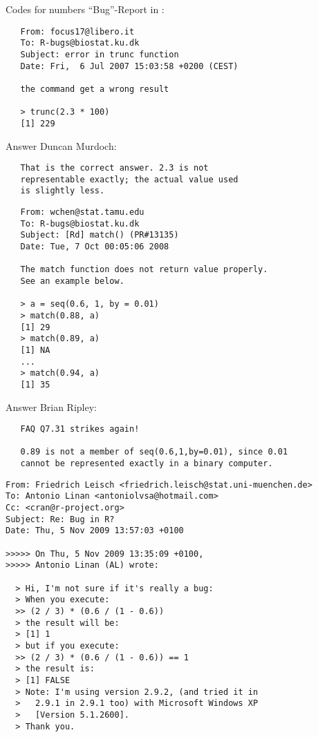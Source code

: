\begin{vbframe}{Codes for numbers}
\enquote{Bug}-Report in :
\small
\begin{verbatim}
   From: focus17@libero.it
   To: R-bugs@biostat.ku.dk
   Subject: error in trunc function
   Date: Fri,  6 Jul 2007 15:03:58 +0200 (CEST)

   the command get a wrong result

   > trunc(2.3 * 100)
   [1] 229
\end{verbatim}

Answer Duncan Murdoch:
\begin{verbatim}
   That is the correct answer. 2.3 is not
   representable exactly; the actual value used
   is slightly less.
\end{verbatim}

\framebreak

\small
\begin{verbatim}
   From: wchen@stat.tamu.edu
   To: R-bugs@biostat.ku.dk
   Subject: [Rd] match() (PR#13135)
   Date: Tue, 7 Oct 00:05:06 2008

   The match function does not return value properly.
   See an example below.

   > a = seq(0.6, 1, by = 0.01)
   > match(0.88, a)
   [1] 29
   > match(0.89, a)
   [1] NA
   ...
   > match(0.94, a)
   [1] 35
\end{verbatim}

\framebreak 

Answer Brian Ripley:
\begin{verbatim}
   FAQ Q7.31 strikes again!

   0.89 is not a member of seq(0.6,1,by=0.01), since 0.01
   cannot be represented exactly in a binary computer.
\end{verbatim}


\framebreak

\small
\begin{verbatim}
From: Friedrich Leisch <friedrich.leisch@stat.uni-muenchen.de>
To: Antonio Linan <antoniolvsa@hotmail.com>
Cc: <cran@r-project.org>
Subject: Re: Bug in R?
Date: Thu, 5 Nov 2009 13:57:03 +0100

>>>>> On Thu, 5 Nov 2009 13:35:09 +0100,
>>>>> Antonio Linan (AL) wrote:

  > Hi, I'm not sure if it's really a bug:
  > When you execute:
  >> (2 / 3) * (0.6 / (1 - 0.6))
  > the result will be:
  > [1] 1
  > but if you execute:
  >> (2 / 3) * (0.6 / (1 - 0.6)) == 1
  > the result is:
  > [1] FALSE
  > Note: I'm using version 2.9.2, (and tried it in
  >   2.9.1 in 2.9.1 too) with Microsoft Windows XP
  >   [Version 5.1.2600].
  > Thank you.


\end{verbatim}
\end{vbframe}
